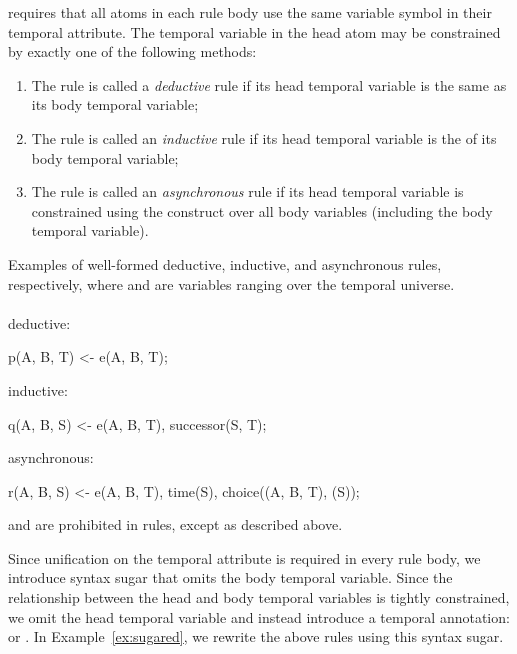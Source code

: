 \vspace{1em}
\lang requires that all atoms in each rule body use the same variable symbol in their temporal attribute.  The temporal variable in the head atom may be constrained by exactly one of the following methods:

\begin{enumerate}
\item The rule is called a {\em deductive} rule if its head temporal variable is the same as its body temporal variable;
\item The rule is called an {\em inductive} rule if its head temporal variable is the  of its body temporal variable;
\item The rule is called an {\em asynchronous} rule if its head temporal variable is constrained using the  construct over all body variables (including the body temporal variable).
\end{enumerate}

\begin{example}
\label{ex:nonsugared}
Examples of well-formed deductive, inductive, and asynchronous rules, respectively, where  and  are variables ranging over the temporal universe.
\\\\
deductive:
\begin{Dedalus}
p(A, B, T) <- e(A, B, T);
\end{Dedalus}
inductive:
\begin{Dedalus}
q(A, B, S) <- e(A, B, T), successor(S, T);
\end{Dedalus}
asynchronous:
\begin{Dedalus}
r(A, B, S) <- e(A, B, T), time(S),
              choice((A, B, T), (S));
\end{Dedalus}
\end{example}

 and  are prohibited in rules, except as described above.

Since unification on the temporal attribute is required in every rule body, we introduce syntax sugar that omits the body temporal variable.  Since the relationship between the head and body temporal variables is tightly constrained, we omit the head temporal variable and instead introduce a temporal annotation:  or .  In Example~\ref{ex:sugared}, we rewrite the above rules using this syntax sugar.

